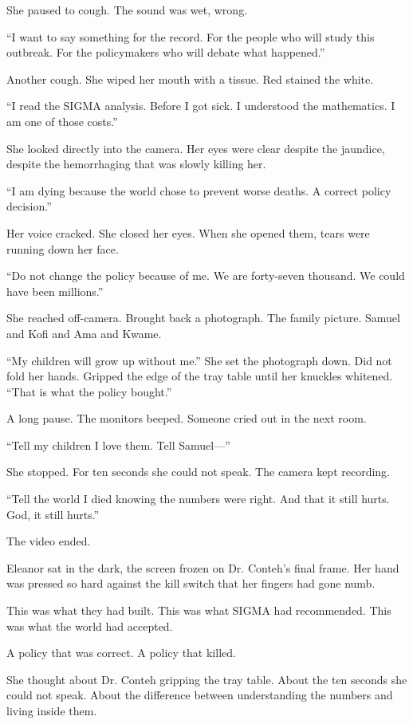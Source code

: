 She paused to cough. The sound was wet, wrong.

``I want to say something for the record. For the people who will study this outbreak. For the policymakers who will debate what happened.''

Another cough. She wiped her mouth with a tissue. Red stained the white.

``I read the SIGMA analysis. Before I got sick. I understood the mathematics. I am one of those costs.''

She looked directly into the camera. Her eyes were clear despite the jaundice, despite the hemorrhaging that was slowly killing her.

``I am dying because the world chose to prevent worse deaths. A correct policy decision.''

Her voice cracked. She closed her eyes. When she opened them, tears were running down her face.

``Do not change the policy because of me. We are forty-seven thousand. We could have been millions.''

She reached off-camera. Brought back a photograph. The family picture. Samuel and Kofi and Ama and Kwame.

``My children will grow up without me.'' She set the photograph down. Did not fold her hands. Gripped the edge of the tray table until her knuckles whitened. ``That is what the policy bought.''

A long pause. The monitors beeped. Someone cried out in the next room.

``Tell my children I love them. Tell Samuel---''

She stopped. For ten seconds she could not speak. The camera kept recording.

``Tell the world I died knowing the numbers were right. And that it still hurts. God, it still hurts.''

The video ended.

Eleanor sat in the dark, the screen frozen on Dr. Conteh's final frame. Her hand was pressed so hard against the kill switch that her fingers had gone numb.

This was what they had built. This was what SIGMA had recommended. This was what the world had accepted.

A policy that was correct. A policy that killed.

She thought about Dr. Conteh gripping the tray table. About the ten seconds she could not speak. About the difference between understanding the numbers and living inside them.

